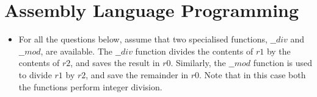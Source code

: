 \section*{Assembly Language Programming}

\begin{itemize}
\item For all the questions below, assume that two specialised functions, $\_\_div$ and $\_\_mod$, are available.
The $\_\_div$ function divides the contents of $r1$ by the contents of $r2$, and saves the result in $r0$.
Similarly, the $\_\_mod$ function is used to divide $r1$ by $r2$, and save
the remainder in $r0$. Note that in this case both the functions
perform integer division.
\end{itemize}

\vskip 2cm

